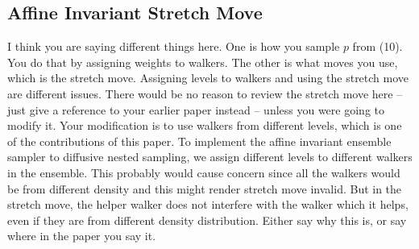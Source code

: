 \documentclass[letterpaper, preprint]{aastex}
\newcommand{\qer}[1]{{\color{red}#1}}
\begin{document}
\subsection{Affine Invariant Stretch Move}
\qer{I think you are saying different things here.
One is how you sample $p$ from (10).
You do that by assigning weights to walkers.
The other is what moves you use, which is the stretch move.
Assigning levels to walkers and using the stretch move are different issues.
There would be no reason to review the stretch move here -- just give a reference to 
your earlier paper instead -- unless you were going to modify it.
Your modification is to use walkers from different levels, which is one of the 
contributions of this paper.}
To implement the affine invariant ensemble sampler to diffusive nested sampling, we assign different levels to different walkers in the ensemble. This probably would cause concern since all the walkers would be from different density and this might render stretch move invalid. But in the stretch move, the helper walker does not interfere with the walker which it helps, even if they are from different density distribution. \qer{Either say why this is, or say where in the paper you say it.}
\end{document}
